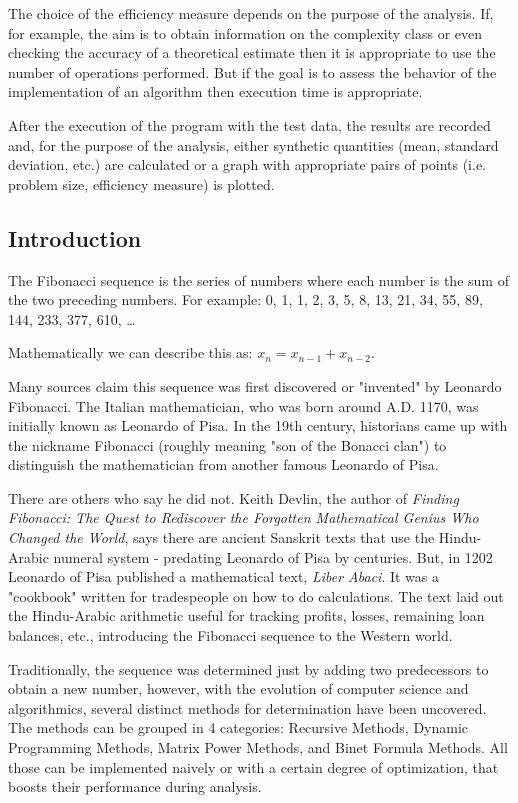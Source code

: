 \documentclass[12pt]{article}
\begin{document}
The choice of the efficiency measure depends on the purpose of the analysis. If, for example, the
aim is to obtain information on the complexity class or even checking the accuracy of a theoretical
estimate then it is appropriate to use the number of operations performed. But if the goal is to assess the
behavior of the implementation of an algorithm then execution time is appropriate.

After the execution of the program with the test data, the results are recorded and, for the purpose
of the analysis, either synthetic quantities (mean, standard deviation, etc.) are calculated or a graph with
appropriate pairs of points (i.e. problem size, efficiency measure) is plotted.

\subsection{Introduction}
\hspace{0.8cm} The Fibonacci sequence is the series of numbers where each number is the sum of the two
preceding numbers. For example: 0, 1, 1, 2, 3, 5, 8, 13, 21, 34, 55, 89, 144, 233, 377, 610, \ldots

Mathematically we can describe this as: $x_n = x_{n-1} + x_{n-2}$.

Many sources claim this sequence was first discovered or "invented" by Leonardo Fibonacci. The
Italian mathematician, who was born around A.D. 1170, was initially known as Leonardo of Pisa. In the
19th century, historians came up with the nickname Fibonacci (roughly meaning "son of the Bonacci
clan") to distinguish the mathematician from another famous Leonardo of Pisa.

There are others who say he did not. Keith Devlin, the author of \textit{Finding Fibonacci: The Quest to
Rediscover the Forgotten Mathematical Genius Who Changed the World}, says there are ancient Sanskrit
texts that use the Hindu-Arabic numeral system - predating Leonardo of Pisa by centuries.
But, in 1202 Leonardo of Pisa published a mathematical text, \textit{Liber Abaci}. It was a "cookbook" written
for tradespeople on how to do calculations. The text laid out the Hindu-Arabic arithmetic useful for
tracking profits, losses, remaining loan balances, etc., introducing the Fibonacci sequence to the Western
world.

Traditionally, the sequence was determined just by adding two predecessors to obtain a new
number, however, with the evolution of computer science and algorithmics, several distinct methods for
determination have been uncovered. The methods can be grouped in 4 categories: Recursive Methods,
Dynamic Programming Methods, Matrix Power Methods, and Binet Formula Methods. All those can be
implemented naively or with a certain degree of optimization, that boosts their performance during
analysis.
\end{document}
